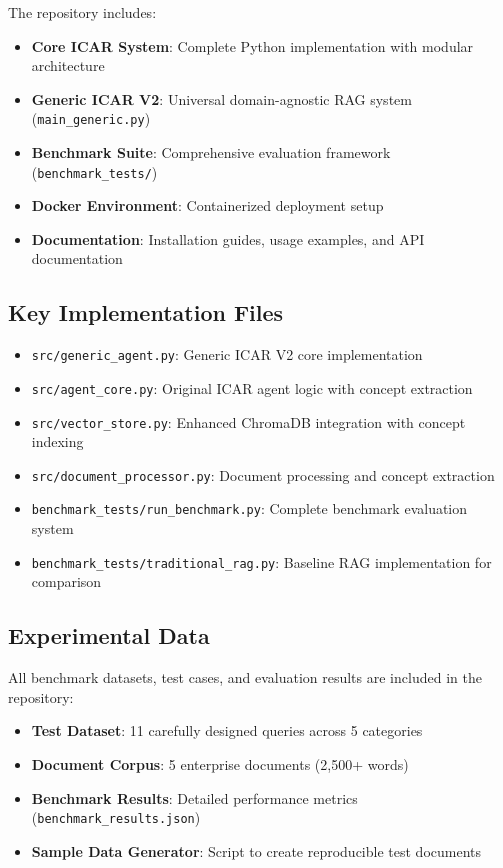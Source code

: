 \documentclass[11pt]{article}
\begin{document}
The repository includes:
\begin{itemize}
\item \textbf{Core ICAR System}: Complete Python implementation with modular architecture
\item \textbf{Generic ICAR V2}: Universal domain-agnostic RAG system (\texttt{main\_generic.py})
\item \textbf{Benchmark Suite}: Comprehensive evaluation framework (\texttt{benchmark\_tests/})
\item \textbf{Docker Environment}: Containerized deployment setup
\item \textbf{Documentation}: Installation guides, usage examples, and API documentation
\end{itemize}

\subsection*{Key Implementation Files}
\begin{itemize}
\item \texttt{src/generic\_agent.py}: Generic ICAR V2 core implementation
\item \texttt{src/agent\_core.py}: Original ICAR agent logic with concept extraction
\item \texttt{src/vector\_store.py}: Enhanced ChromaDB integration with concept indexing
\item \texttt{src/document\_processor.py}: Document processing and concept extraction
\item \texttt{benchmark\_tests/run\_benchmark.py}: Complete benchmark evaluation system
\item \texttt{benchmark\_tests/traditional\_rag.py}: Baseline RAG implementation for comparison
\end{itemize}

\subsection*{Experimental Data}
All benchmark datasets, test cases, and evaluation results are included in the repository:
\begin{itemize}
\item \textbf{Test Dataset}: 11 carefully designed queries across 5 categories
\item \textbf{Document Corpus}: 5 enterprise documents (2,500+ words)
\item \textbf{Benchmark Results}: Detailed performance metrics (\texttt{benchmark\_results.json})
\item \textbf{Sample Data Generator}: Script to create reproducible test documents
\end{itemize}
\end{document}
